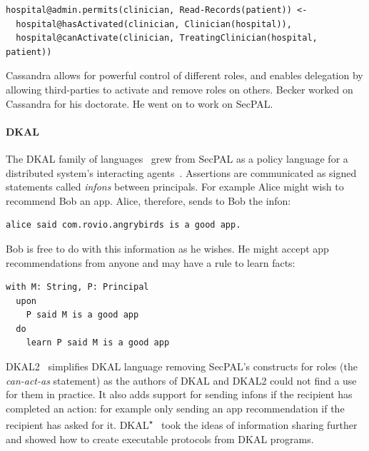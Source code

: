 \documentclass[thesis.tex]{subfiles}
\begin{document}
\noindent\begin{minipage}{\textwidth}
\begin{lstlisting}
hospital@admin.permits(clinician, Read-Records(patient)) <-
  hospital@hasActivated(clinician, Clinician(hospital)),
  hospital@canActivate(clinician, TreatingClinician(hospital, patient))
\end{lstlisting}
\end{minipage}

Cassandra allows for powerful control of different roles, and enables
delegation by allowing third-parties to activate and remove roles
on others.  
Becker worked on Cassandra for his doctorate.  He went on to work on SecPAL.

\paragraph*{DKAL}
The DKAL family of
languages~\cite{jeannin_dkal*:_2013,gurevich_dkal:_2008,yuri_gurevich_dkal2---simplified_2009}
grew from SecPAL as a policy language for a distributed system's
interacting agents~\cite{blass_introduction_2012}. Assertions are
communicated as signed statements called \emph{infons} between
principals. For example Alice might wish to recommend Bob an
app. Alice, therefore, sends to Bob the infon:

\begin{lstlisting}
alice said com.rovio.angrybirds is a good app.
\end{lstlisting}

Bob is free to do with this information as he wishes. He might accept
app recommendations from anyone and may have a rule to learn facts:

\noindent\begin{minipage}{\textwidth}
\begin{lstlisting}
with M: String, P: Principal
  upon
    P said M is a good app
  do
    learn P said M is a good app
\end{lstlisting}
\end{minipage}

DKAL2~\cite{yuri_gurevich_dkal2---simplified_2009} simplifies DKAL
language removing SecPAL's constructs for roles (the \emph{can-act-as} statement)
as the authors of DKAL and DKAL2 could not find a use for them in practice.  It also adds
support for sending infons if the recipient has completed an action:
for example only sending an app recommendation if the recipient has
asked for it.
DKAL\textsuperscript{$\star$}~\cite{jeannin_dkal*:_2013} took the ideas of information sharing
further and showed how to create executable protocols from DKAL programs.
\end{document}
